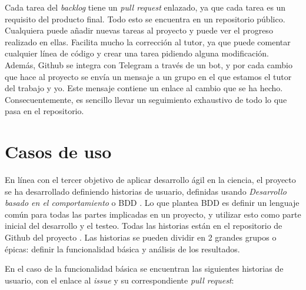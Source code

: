 Cada tarea del \emph{backlog} tiene un \emph{pull request} enlazado, ya que cada tarea es un requisito del producto final. Todo
esto se encuentra en un repositorio público. Cualquiera puede añadir nuevas tareas al proyecto y puede ver el progreso realizado en ellas.
Facilita mucho la corrección al tutor, ya que puede comentar cualquier línea de código y crear una tarea pidiendo alguna
modificación. Además, Github se integra con Telegram a través de un bot, y por cada cambio que hace al proyecto se envía un mensaje
a un grupo en el que estamos el tutor del trabajo y yo. Este mensaje contiene un enlace al cambio que se ha hecho. Consecuentemente,
es sencillo llevar un seguimiento exhaustivo de todo lo que pasa en el repositorio.

\section{Casos de uso} \label{sect:use_cases}

En línea con el tercer objetivo de aplicar desarrollo ágil en la ciencia, el proyecto se ha desarrollado definiendo
historias de usuario, definidas usando \emph{Desarrollo basado en el comportamiento} o BDD \cite{BDD}. Lo que 
plantea BDD es definir un lenguaje común para todas las partes implicadas en un proyecto, y utilizar esto como parte inicial 
del desarrollo y el testeo. Todas las historias están en el repositorio de Github del proyecto \cite{project_repository}.
Las historias se pueden dividir en 2 grandes grupos o épicas: definir la funcionalidad básica y análisis de los resultados.

En el caso de la funcionalidad básica se encuentran las siguientes historias de usuario, con el enlace al
\emph{issue} y su correspondiente \emph{pull request}:


